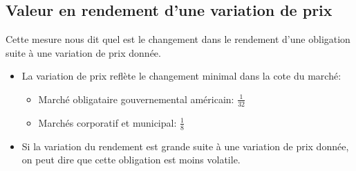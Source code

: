 \documentclass[12pt]{article}
\begin{document}
\subsection{Valeur en rendement d’une variation de prix}
Cette mesure nous dit quel est le changement dans le rendement d'une obligation suite à une variation de prix donnée.  
\begin{itemize}
\item La variation de prix reflète le changement minimal dans la cote du marché: 
\begin{itemize}
\item Marché obligataire gouvernemental américain: $\frac{1}{32}$
\item Marchés corporatif et municipal: $\frac{1}{8}$
\end{itemize}
\item Si la variation du rendement est grande suite à une variation de prix donnée, on peut dire que cette obligation est moins volatile.
\end{itemize}
\end{document}

